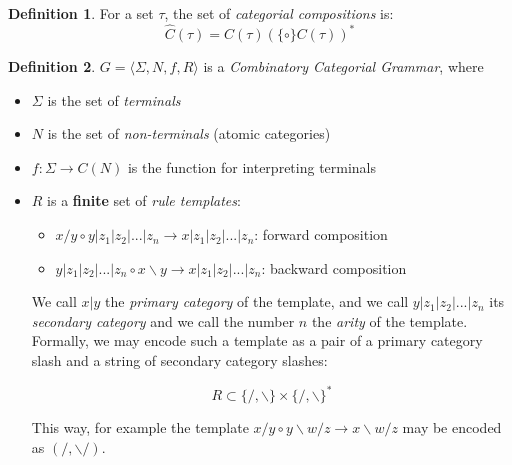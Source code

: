 \documentclass[12pt]{extarticle}
\theoremstyle{definition} \newtheorem{defn}{Definition}
\newcommand{\lc}{\backslash}
\newcommand{\rc}{/}
\newcommand{\mc}{|}
\begin{document}
\begin{defn}
    For a set $\tau$, the set of \emph{categorial compositions} is:
    \[ \hat{C}(\tau) = C(\tau) (\{\circ\} C(\tau))^* \]
\end{defn}

\begin{defn}
    $ G = \langle \Sigma, N, f, R \rangle $ is a \emph{Combinatory Categorial Grammar}, where
    \begin{itemize}
        \item $ \Sigma $ is the set of \emph{terminals}
        \item $ N $ is the set of \emph{non-terminals} (atomic categories)
        \item $ f : \Sigma \rightarrow C(N) $ is the function for interpreting
            terminals
        \item $ R $ is a \textbf{finite} set of \emph{rule templates}:
            \begin{itemize}
                \item $x \rc y \circ y \mc z_1 \mc z_2 \mc ... \mc z_n \rightarrow x \mc z_1 \mc z_2 \mc ... \mc z_n$: forward  composition
                \item $y \mc z_1 \mc z_2 \mc ... \mc z_n \circ x \lc y \rightarrow x \mc z_1 \mc z_2 \mc ... \mc z_n$: backward composition
            \end{itemize}

            We call $x \mc y$ the \emph{primary category} of the template, and
            we call $y \mc z_1 \mc z_2 \mc ... \mc z_n$ its \emph{secondary category}
            and we call the number $n$ the \emph{arity} of the template.
            Formally, we may encode such a template as a pair of a primary category
            slash and a string of secondary category slashes:

            \[ R \subset \{ \rc, \lc \} \times \{ \rc, \lc \}^* \]

            This way, for example the template
            $x \rc y \circ y \lc w \rc z \rightarrow x \lc w \rc z$
            may be encoded as $(\rc, \lc \rc)$.
    \end{itemize}
\end{defn}
\end{document}
